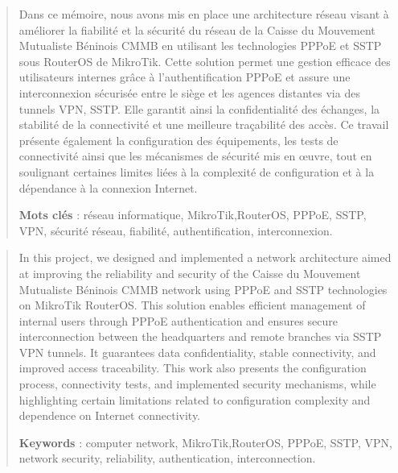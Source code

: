 \resume
{}
\vspace*{-6cm}
\begin{abstract}

Dans ce mémoire, nous avons mis en place une architecture réseau visant à améliorer la fiabilité et la sécurité du réseau de la Caisse du Mouvement Mutualiste Béninois \gls{CMMB} en utilisant les technologies \gls{PPPoE} et \gls{SSTP} sous \gls{RouterOS} de MikroTik. Cette solution permet une gestion efficace des utilisateurs internes grâce à l’authentification \gls{PPPoE} et assure une interconnexion sécurisée entre le siège et les agences distantes via des tunnels \gls{VPN}, \gls{SSTP}. Elle garantit ainsi la confidentialité des échanges, la stabilité de la connectivité et une meilleure traçabilité des accès. Ce travail présente également la configuration des équipements, les tests de connectivité ainsi que les mécanismes de sécurité mis en œuvre, tout en soulignant certaines limites liées à la complexité de configuration et à la dépendance à la connexion Internet.

\vspace{0.5cm}

\textbf{Mots clés} : réseau informatique, MikroTik,\gls{RouterOS}, \gls{PPPoE}, \gls{SSTP}, \gls{VPN}, sécurité réseau, fiabilité, authentification, interconnexion.

\end{abstract}

\newpage
\thispagestyle{empty}
\begin{abstract}

In this project, we designed and implemented a network architecture aimed at improving the reliability and security of the Caisse du Mouvement Mutualiste Béninois \gls{CMMB} network using \gls{PPPoE} and \gls{SSTP} technologies on MikroTik \gls{RouterOS}. This solution enables efficient management of internal users through \gls{PPPoE} authentication and ensures secure interconnection between the headquarters and remote branches via \gls{SSTP} \gls{VPN} tunnels. It guarantees data confidentiality, stable connectivity, and improved access traceability. This work also presents the configuration process, connectivity tests, and implemented security mechanisms, while highlighting certain limitations related to configuration complexity and dependence on Internet connectivity.

\vspace{0.5cm}

\textbf{Keywords} : computer network, MikroTik,\gls{RouterOS}, \gls{PPPoE}, \gls{SSTP}, \gls{VPN}, network security, reliability, authentication, interconnection.

\end{abstract}
